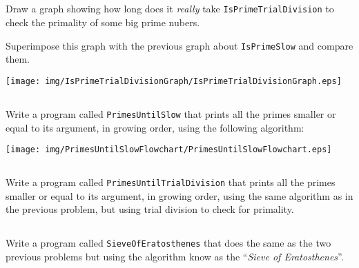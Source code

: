 \documentclass[a4paper, 12pt]{article}
\begin{document}
\subsection{}

Draw a graph showing how long does it \emph{really} take
\texttt{IsPrimeTrialDivision} to check the primality of some big prime nubers.

Superimpose this graph with the previous graph about \texttt{IsPrimeSlow} and
compare them.

\begin{solution}
  \centering
  \texttt{[image: img/IsPrimeTrialDivisionGraph/IsPrimeTrialDivisionGraph.eps]}
\end{solution}

\subsection{}

Write a program called \texttt{PrimesUntilSlow} that prints all the primes
smaller or equal to its argument, in growing order, using the following
algorithm:

\begin{center}
  \texttt{[image: img/PrimesUntilSlowFlowchart/PrimesUntilSlowFlowchart.eps]}
\end{center}
\vspace{1cm}



\subsection{}

Write a program called \texttt{PrimesUntilTrialDivision} that prints all the
primes smaller or equal to its argument, in growing order, using the same
algorithm as in the previous problem, but using trial division to check for
primality.


\subsection{}

Write a program called \texttt{SieveOfEratosthenes} that does the same as the
two previous problems but using the algorithm know as the ``\emph{Sieve of
Eratosthenes}''.
\end{document}
